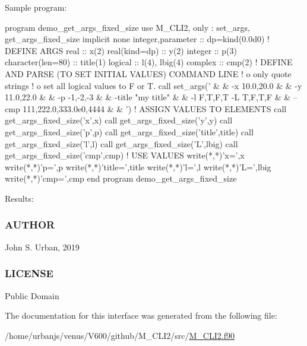 Sample program\+: \begin{DoxyVerb}program demo_get_args_fixed_size
use M_CLI2,  only : set_args, get_args_fixed_size
implicit none
integer,parameter   :: dp=kind(0.0d0)
! DEFINE ARGS
real                :: x(2)
real(kind=dp)       :: y(2)
integer             :: p(3)
character(len=80)   :: title(1)
logical             :: l(4), lbig(4)
complex             :: cmp(2)
! DEFINE AND PARSE (TO SET INITIAL VALUES) COMMAND LINE
!   o only quote strings
!   o set all logical values to F or T.
call set_args(' &
   & -x 10.0,20.0 &
   & -y 11.0,22.0 &
   & -p -1,-2,-3 &
   & -title "my title" &
   & -l F,T,F,T -L T,F,T,F  &
   & --cmp 111,222.0,333.0e0,4444 &
   & ')
! ASSIGN VALUES TO ELEMENTS
   call get_args_fixed_size('x',x)
   call get_args_fixed_size('y',y)
   call get_args_fixed_size('p',p)
   call get_args_fixed_size('title',title)
   call get_args_fixed_size('l',l)
   call get_args_fixed_size('L',lbig)
   call get_args_fixed_size('cmp',cmp)
! USE VALUES
   write(*,*)'x=',x
   write(*,*)'p=',p
   write(*,*)'title=',title
   write(*,*)'l=',l
   write(*,*)'L=',lbig
   write(*,*)'cmp=',cmp
end program demo_get_args_fixed_size
\end{DoxyVerb}
 Results\+:

\subsubsection*{A\+U\+T\+H\+OR}

John S. Urban, 2019 \subsubsection*{L\+I\+C\+E\+N\+SE}

Public Domain 

The documentation for this interface was generated from the following file\+:\begin{DoxyCompactItemize}
\item 
/home/urbanjs/venus/\+V600/github/\+M\+\_\+\+C\+L\+I2/src/\mbox{\hyperlink{M__CLI2_8f90}{M\+\_\+\+C\+L\+I2.\+f90}}\end{DoxyCompactItemize}
